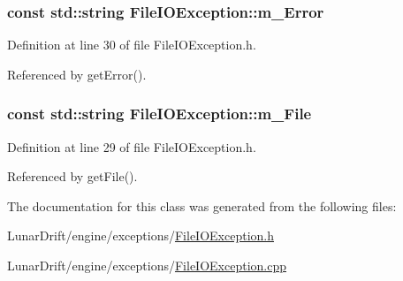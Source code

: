 \subsubsection[{\texorpdfstring{m\+\_\+\+Error}{m_Error}}]{\setlength{\rightskip}{0pt plus 5cm}const std\+::string File\+I\+O\+Exception\+::m\+\_\+\+Error\hspace{0.3cm}{\ttfamily [private]}}\hypertarget{class_file_i_o_exception_a2f1715571b72f01da492e6d2429f7a29}{}\label{class_file_i_o_exception_a2f1715571b72f01da492e6d2429f7a29}


Definition at line 30 of file File\+I\+O\+Exception.\+h.



Referenced by get\+Error().

\subsubsection[{\texorpdfstring{m\+\_\+\+File}{m_File}}]{\setlength{\rightskip}{0pt plus 5cm}const std\+::string File\+I\+O\+Exception\+::m\+\_\+\+File\hspace{0.3cm}{\ttfamily [private]}}\hypertarget{class_file_i_o_exception_aabe82501c1620dae2236fe2c877c36ed}{}\label{class_file_i_o_exception_aabe82501c1620dae2236fe2c877c36ed}


Definition at line 29 of file File\+I\+O\+Exception.\+h.



Referenced by get\+File().



The documentation for this class was generated from the following files\+:\begin{DoxyCompactItemize}
\item 
Lunar\+Drift/engine/exceptions/\hyperlink{_file_i_o_exception_8h}{File\+I\+O\+Exception.\+h}\item 
Lunar\+Drift/engine/exceptions/\hyperlink{_file_i_o_exception_8cpp}{File\+I\+O\+Exception.\+cpp}\end{DoxyCompactItemize}
